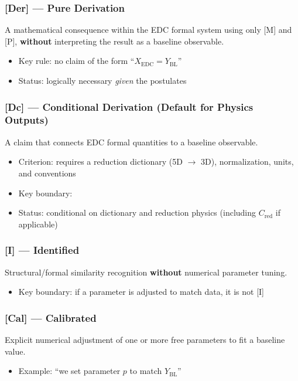 \subsubsection*{[Der] --- Pure Derivation}
A mathematical consequence within the EDC formal system using only [M] and [P],
\textbf{without} interpreting the result as a baseline observable.
\begin{itemize}
\item Key rule: no claim of the form ``$X_{\mathrm{EDC}} = Y_{\mathrm{BL}}$''
\item Status: logically necessary \emph{given} the postulates
\end{itemize}

\subsubsection*{[Dc] --- Conditional Derivation (Default for Physics Outputs)}
A claim that connects EDC formal quantities to a baseline observable.
\begin{itemize}
\item Criterion: requires a reduction dictionary (5D $\to$ 3D), normalization, units, and conventions
\item Key boundary:
\begin{center}
\end{center}
\item Status: conditional on dictionary and reduction physics (including $C_{\mathrm{red}}$ if applicable)
\end{itemize}

\subsubsection*{[I] --- Identified}
Structural/formal similarity recognition \textbf{without} numerical parameter tuning.
\begin{itemize}
\item Key boundary: if a parameter is adjusted to match data, it is not [I]
\end{itemize}

\subsubsection*{[Cal] --- Calibrated}
Explicit numerical adjustment of one or more free parameters to fit a baseline value.
\begin{itemize}
\item Example: ``we set parameter $p$ to match $Y_{\mathrm{BL}}$''
\end{itemize}

